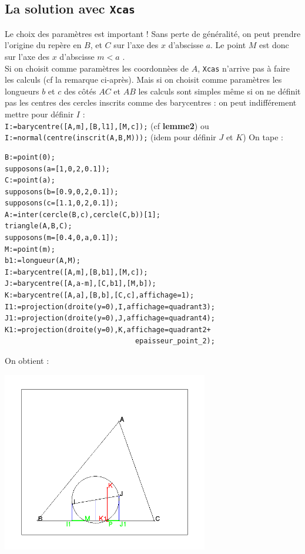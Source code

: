\documentclass[a4paper,11pt]{book}
\begin{document}
\subsection{La solution avec {\tt Xcas}}
Le choix des param\`etres est important !
Sans perte de g\'en\'eralit\'e, on peut prendre l'origine du rep\`ere en $B$,
et $C$ sur l'axe des $x$ d'abscisse $a$. Le point $M$ est donc sur l'axe des 
$x$ d'abscisse $m<a$ .\\
Si on choisit comme param\`etres les coordonn\`ees  de $A$, {\tt Xcas} n'arrive
pas \`a faire les calculs (cf la remarque ci-apr\`es). Mais si on choisit comme param\`etres les longueurs 
$b$ et $c$ des c\^ot\'es $AC$ et $AB$ les calculs sont simples m\^eme si
on ne d\'efinit pas les centres des cercles inscrits comme des barycentres :
on peut indiff\'erement mettre pour d\'efinir $I$ :\\
{\tt I:=barycentre([A,m],[B,l1],[M,c]);} (cf {\bf lemme2}) ou\\
{\tt I:=normal(centre(inscrit(A,B,M)));} (idem pour d\'efinir $J$ et $K$)
On tape :
\begin{verbatim}
B:=point(0);
supposons(a=[1,0,2,0.1]);
C:=point(a);
supposons(b=[0.9,0,2,0.1]);
supposons(c=[1.1,0,2,0.1]);
A:=inter(cercle(B,c),cercle(C,b))[1];
triangle(A,B,C);
supposons(m=[0.4,0,a,0.1]);
M:=point(m);
b1:=longueur(A,M);
I:=barycentre([A,m],[B,b1],[M,c]);
J:=barycentre([A,a-m],[C,b1],[M,b]);
K:=barycentre([A,a],[B,b],[C,c],affichage=1);
I1:=projection(droite(y=0),I,affichage=quadrant3);
J1:=projection(droite(y=0),J,affichage=quadrant4);
K1:=projection(droite(y=0),K,affichage=quadrant2+
                               epaisseur_point_2);
\end{verbatim}
On obtient :
\begin{center}\includegraphics[width=9cm]{inscritabc}\end{center}
\end{document}
